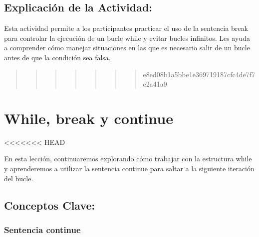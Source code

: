 \documentclass[
  a4paper,
  onepage,
  openany]{scrreprt}
\begin{document}
\hypertarget{explicaciuxf3n-de-la-actividad-37}{%
\section{Explicación de la
Actividad:}\label{explicaciuxf3n-de-la-actividad-37}}

Esta actividad permite a los participantes practicar el uso de la
sentencia break para controlar la ejecución de un bucle while y evitar
bucles infinitos. Les ayuda a comprender cómo manejar situaciones en las
que es necesario salir de un bucle antes de que la condición sea falsa.

\begin{quote}
\begin{quote}
\begin{quote}
\begin{quote}
\begin{quote}
\begin{quote}
\begin{quote}
e8ed08b1a5bbe1e369719187cfc4de7f7e2a41a9
\end{quote}
\end{quote}
\end{quote}
\end{quote}
\end{quote}
\end{quote}
\end{quote}

\hypertarget{while-break-y-continue}{%
\chapter{While, break y continue}\label{while-break-y-continue}}

\textless\textless\textless\textless\textless\textless\textless{} HEAD

En esta lección, continuaremos explorando cómo trabajar con la
estructura while y aprenderemos a utilizar la sentencia continue para
saltar a la siguiente iteración del bucle.

\hypertarget{conceptos-clave-40}{%
\section{Conceptos Clave:}\label{conceptos-clave-40}}

\hypertarget{sentencia-continue}{%
\subsection{Sentencia continue}\label{sentencia-continue}}
\end{document}
